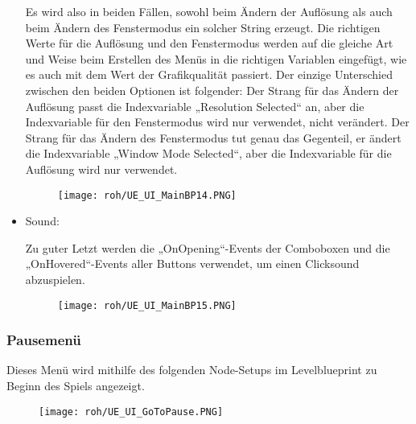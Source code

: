 \begin{itemize}
    Es wird also in beiden Fällen, sowohl beim Ändern der Auflösung als auch beim Ändern des Fenstermodus ein solcher String erzeugt.
    Die richtigen Werte für die Auflösung und den Fenstermodus werden auf die gleiche Art und Weise beim Erstellen des Menüs in die richtigen Variablen eingefügt, wie es auch mit dem Wert der Grafikqualität passiert.
    Der einzige Unterschied zwischen den beiden Optionen ist folgender: Der Strang für das Ändern der Auflösung passt die Indexvariable „Resolution Selected“ an, aber die Indexvariable für den Fenstermodus wird nur verwendet, nicht verändert. Der Strang für das Ändern des Fenstermodus tut genau das Gegenteil, er ändert die Indexvariable „Window Mode Selected“, aber die Indexvariable für die Auflösung wird nur verwendet.
    \begin{figure}[H]
        \centering
        \texttt{[image: roh/UE\_UI\_MainBP14.PNG]}
        \label{UE:UI_MainBP14}
    \end{figure}
    \item Sound:

    Zu guter Letzt werden die „OnOpening“-Events der Comboboxen und die „OnHovered“-Events aller Buttons verwendet, um einen Clicksound abzuspielen.
    \begin{figure}[H]
        \centering
        \texttt{[image: roh/UE\_UI\_MainBP15.PNG]}
        \label{UE:UI_MainBP15}
    \end{figure}
\end{itemize}
\subsubsection{Pausemenü}
Dieses Menü wird mithilfe des folgenden Node-Setups im Levelblueprint zu Beginn des Spiels angezeigt.
\begin{figure}[H]
    \centering
    \texttt{[image: roh/UE\_UI\_GoToPause.PNG]}
    \label{UE:UI_GoToPause}
\end{figure}
